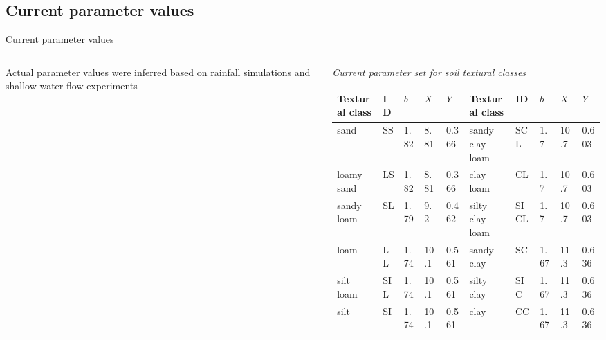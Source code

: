 \subsection{Current  parameter values}
\begin{block}{Current  parameter values}\vspace{-0.25cm}
\begin{columns}
    \begin{column}{0.25\textwidth}
        \justifying
        Actual parameter values were inferred based on rainfall simulations and shallow water flow experiments~\cite{kavka}
    \end{column}
    \begin{column}{0.75\textwidth}
        {\it Current parameter set for soil textural classes}
        \begin{table}[]
            \small
            \begin{tabular}{lllll|lllll}
            \hline
            \hline
            Textural class & ID  & $b$    & $X$    & $Y$     & Textural class  & ID   & $b$    & $X$    & $Y$  \\
            \hline
            sand           & SS  & 1.82 & 8.81 & 0.366 & sandy clay loam & SCL  & 1.7  & 10.7 & 0.603 \\
            loamy sand     & LS  & 1.82 & 8.81 & 0.366 & clay loam       & CL   & 1.7  & 10.7 & 0.603 \\
            sandy loam     & SL  & 1.79 & 9.2  & 0.462 & silty clay loam & SICL & 1.7  & 10.7 & 0.603 \\
            loam           & LL  & 1.74 & 10.1 & 0.561 & sandy clay      & SC   & 1.67 & 11.3 & 0.636 \\
            silt loam      & SIL & 1.74 & 10.1 & 0.561 & silty clay      & SIC  & 1.67 & 11.3 & 0.636 \\
            silt           & SI  & 1.74 & 10.1 & 0.561 & clay            & CC   & 1.67 & 11.3 & 0.636 \\
            \hline
            \hline
            \end{tabular}
        \end{table}
    \end{column}
\end{columns}
    
\end{block}

